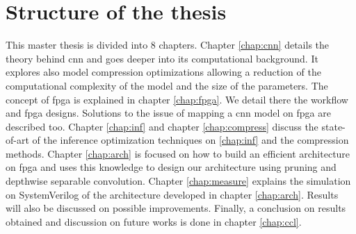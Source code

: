 \section*{Structure of the thesis}
This master thesis is divided into 8 chapters. \newline \newline
Chapter \ref{chap:cnn} details the theory behind \acrshort{cnn} and goes deeper into its computational background. It explores also model compression optimizations allowing a reduction of the computational complexity of the model and the size of the parameters. \newline \newline
The concept of \acrshort{fpga} is explained in chapter \ref{chap:fpga}. We detail there the workflow and \acrshort{fpga} designs. Solutions to the issue of mapping a \acrshort{cnn} model on \acrshort{fpga} are described too. \newline \newline
Chapter \ref{chap:inf} and chapter \ref{chap:compress} discuss the state-of-art of the inference optimization techniques on \ref{chap:inf} and the compression methods.\newline \newline
Chapter \ref{chap:arch} is focused on how to build an efficient architecture on \acrshort{fpga} and uses this knowledge to design our architecture using pruning and depthwise separable convolution.\newline \newline
Chapter \ref{chap:measure} explains the simulation on SystemVerilog of the architecture developed in chapter \ref{chap:arch}. Results will also be discussed on possible improvements.\newline \newline
Finally, a conclusion on results obtained and discussion on future works is done in chapter \ref{chap:ccl}.
\afterpage{\blankpage}
\cleardoublepage
\newpage
